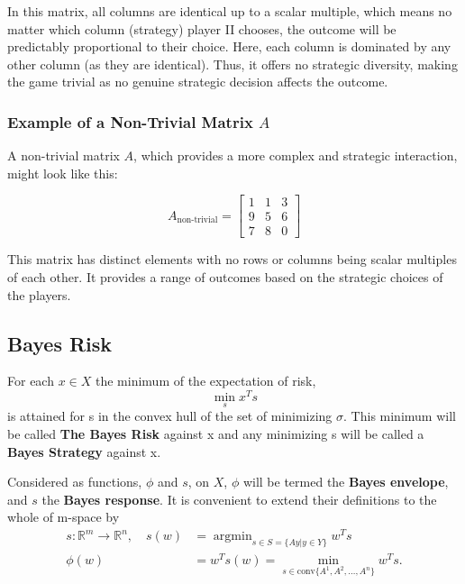 \documentclass[11pt]{article}
\DeclareMathOperator*{\argmin}{argmin}
\theoremstyle{boldStyle}
\begin{document}
In this matrix, all columns are identical up to a scalar multiple, which means no matter which column (strategy) player II chooses, the outcome will be predictably proportional to their choice. Here, each column is dominated by any other column (as they are identical). Thus, it offers no strategic diversity, making the game trivial as no genuine strategic decision affects the outcome.

\subsubsection{Example of a Non-Trivial Matrix \( A \)}

A non-trivial matrix \( A \), which provides a more complex and strategic interaction, might look like this:

\begin{equation*} \label{eq:nontrivial}
    A_{\text{non-trivial}} = \begin{bmatrix}
    1 & 1 & 3 \\
    9 & 5 & 6 \\
    7 & 8 & 0
    \end{bmatrix}
\end{equation*}

This matrix has distinct elements with no rows or columns being scalar multiples of each other. It provides a range of outcomes based on the strategic choices of the players. 



\subsection{Bayes Risk}

For each $x \in X$ the minimum of the expectation of risk, 
\[
    \min_{s} x^T s
\]
is attained for s in the convex hull of the set of minimizing $\sigma$. 
This minimum will be called \textbf{The Bayes Risk} against x and any minimizing s will be called a \textbf{Bayes Strategy} against x.

Considered as functions, $\phi$ and $s$, on $X$, $\phi$ will be termed the \textbf{Bayes envelope}, and $s$ the \textbf{Bayes response}.
It is convenient to extend their definitions to the whole of m-space by 
\begin{equation}
    \begin{aligned}
        s : \mathbb{R}^m \rightarrow \mathbb{R}^n, \quad s(w) &= \argmin_{s \in S = \{Ay | y \in Y \}} w^T s \\
        \phi(w) &=  w^T s(w) = \min_{s \in \text{conv}\{A^1, A^2, \ldots, A^n\}} w^T s.
    \end{aligned}
\end{equation}
\end{document}
